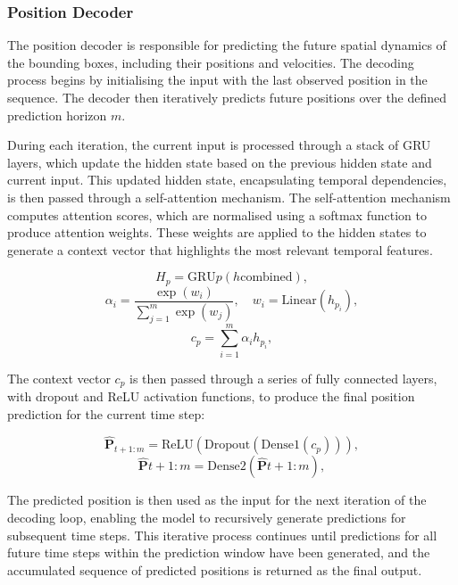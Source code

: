 \documentclass[12pt,oneside]{book} %
\begin{document}
\subsubsection{Position Decoder}
The position decoder is responsible for predicting the future spatial dynamics
of the bounding boxes, including their positions and velocities. The decoding
process begins by initialising the input with the last observed position in the
sequence. The decoder then iteratively predicts future positions over the
defined prediction horizon \(m\).

During each iteration, the current input is processed through a stack of GRU
layers, which update the hidden state based on the previous hidden state and
current input. This updated hidden state, encapsulating temporal dependencies,
is then passed through a self-attention mechanism. The self-attention mechanism
computes attention scores, which are normalised using a softmax function to
produce attention weights. These weights are applied to the hidden states to
generate a context vector that highlights the most relevant temporal features.

\begin{equation}
    H_p = \text{GRU}p(h{\text{combined}}),
\end{equation}
\begin{equation}
    \alpha_i = \frac{\exp(w_i)}{\sum_{j=1}^{m}\exp(w_j)}, \quad w_i = \text{Linear}(h_{p_i}),
\end{equation}
\begin{equation}
    c_p = \sum_{i=1}^{m} \alpha_i h_{p_i},
\end{equation}

The context vector $c_p$ is then passed through a series of fully connected
layers, with dropout and ReLU activation functions, to produce the final
position prediction for the current time step:

\begin{equation}
    \hat{\mathbf{P}}_{t+1:m} = \text{ReLU}(\text{Dropout}(\text{Dense}1(c_p))),
\end{equation}
\begin{equation}
    \hat{\mathbf{P}}{t+1:m} = \text{Dense}2(\hat{\mathbf{P}}{t+1:m}),
\end{equation}

The predicted position is then used as the input for the next iteration of the
decoding loop, enabling the model to recursively generate predictions for
subsequent time steps. This iterative process continues until predictions for
all future time steps within the prediction window have been generated, and the
accumulated sequence of predicted positions is returned as the final output.
\end{document}

